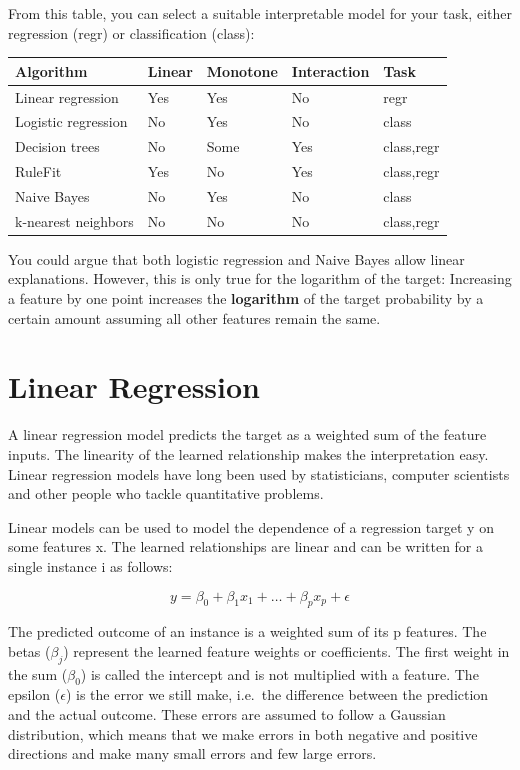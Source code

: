 \documentclass[
  11pt,
]{scrbook}
\begin{document}
From this table, you can select a suitable interpretable model for your task, either regression (regr) or classification (class):

\begin{longtable}[]{@{}lllll@{}}
\toprule
Algorithm & Linear & Monotone & Interaction & Task\tabularnewline
\midrule
\endhead
Linear regression & Yes & Yes & No & regr\tabularnewline
Logistic regression & No & Yes & No & class\tabularnewline
Decision trees & No & Some & Yes & class,regr\tabularnewline
RuleFit & Yes & No & Yes & class,regr\tabularnewline
Naive Bayes & No & Yes & No & class\tabularnewline
k-nearest neighbors & No & No & No & class,regr\tabularnewline
\bottomrule
\end{longtable}

You could argue that both logistic regression and Naive Bayes allow linear explanations.
However, this is only true for the logarithm of the target: Increasing a feature by one point increases the \textbf{logarithm} of the target probability by a certain amount assuming all other features remain the same.

\newpage

\hypertarget{limo}{%
\section{Linear Regression}\label{limo}}

A linear regression model predicts the target as a weighted sum of the feature inputs.
The linearity of the learned relationship makes the interpretation easy.
Linear regression models have long been used by statisticians, computer scientists and other people who tackle quantitative problems.

Linear models can be used to model the dependence of a regression target y on some features x.
The learned relationships are linear and can be written for a single instance i as follows:

\[y=\beta_{0}+\beta_{1}x_{1}+\ldots+\beta_{p}x_{p}+\epsilon\]

The predicted outcome of an instance is a weighted sum of its p features.
The betas (\(\beta_{j}\)) represent the learned feature weights or coefficients.
The first weight in the sum (\(\beta_0\)) is called the intercept and is not multiplied with a feature.
The epsilon (\(\epsilon\)) is the error we still make, i.e.~the difference between the prediction and the actual outcome.
These errors are assumed to follow a Gaussian distribution, which means that we make errors in both negative and positive directions and make many small errors and few large errors.
\end{document}
